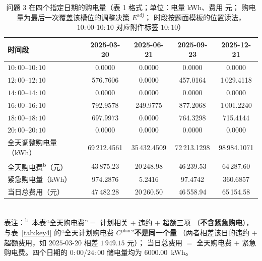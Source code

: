 \begin{table}[htbp]
  \centering
  \caption{问题 3 在四个指定日期的购电量（表 1 格式；单位：电量 kWh、费用 元；
           购电量为最后一次覆盖该槽位的调整决策 \(E^{\text{adj}}\)；
           时段按题面模板的位置读法，\(10{:}00\text{-}10{:}10\) 对应附件标签 \(10{:}10\)）}
  \label{tab:q3-t1}
  \footnotesize
  \setlength{\tabcolsep}{5pt}
  \begin{tabular}{lcccc}
    \toprule
    时间段 & 2025-03-20 & 2025-06-21 & 2025-09-23 & 2025-12-21 \\
    \midrule
    \(10{:}00\)--\(10{:}10\) & 0.0000 & 0.0000 & 0.0000 & 0.0000 \\
    \(12{:}00\)--\(12{:}10\) & 576.7606 & 0.0000 & 457.0164 & 1\,029.4118 \\
    \(14{:}00\)--\(14{:}10\) & 0.0000 & 0.0000 & 0.0000 & 0.0000 \\
    \(16{:}00\)--\(16{:}10\) & 792.9578 & 249.9775 & 877.2068 & 1\,001.2240 \\
    \(18{:}00\)--\(18{:}10\) & 697.9973 & 0.0000 & 764.3298 & 715.4144 \\
    \(20{:}00\)--\(20{:}10\) & 0.0000 & 0.0000 & 0.0000 & 0.0000 \\
    \midrule
    全天调整购电量（kWh） & 69\,212.4561 & 35\,432.4509 & 72\,213.1298 & 98\,984.1071 \\
    全天购电费\textsuperscript{b}（元） & 43\,875.23 & 20\,248.98 & 46\,239.53 & 64\,287.60 \\
    紧急购电量（kWh） & 974.2876 & 5.2416 & 97.4742 & 360.6857 \\
    \midrule
    当日总费用（元） & 47\,482.28 & 20\,260.50 & 46\,558.94 & 65\,154.58 \\
    \bottomrule
  \end{tabular}
  \\[1ex]
  {\footnotesize 表注：\textsuperscript{b}~本表“全天购电费”\(=\) 计划相关 \(+\) 违约 \(+\) 超额三项
   （\textbf{不含紧急购电}），与表~\ref{tab:key4} 的“全天计划购电费 \(C^{\text{plan}}\)”\textbf{不是同一个量}
   （两者相差该日的违约 \(+\) 超额费用，如 \(2025\text{-}03\text{-}20\) 相差 \(1\,949.15\) 元）；
   当日总费用 \(=\) 全天购电费 \(+\) 紧急购电费。四个日期的 \(0{:}00\)/\(24{:}00\) 储电量均为
   \(6000.00\)~kWh。}
\end{table}

